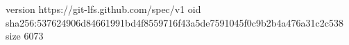 version https://git-lfs.github.com/spec/v1
oid sha256:537624906d84661991bd4f8559716f43a5de7591045f0c9b2b4a476a31c2c538
size 6073
